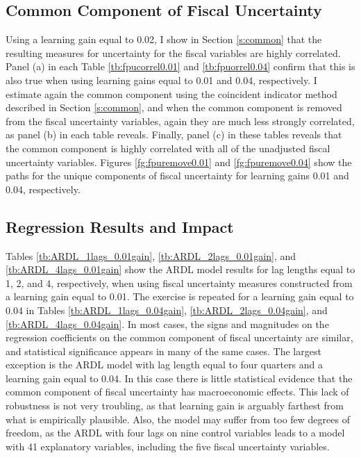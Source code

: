 \documentclass[11pt]{article}
\begin{document}
\subsection{Common Component of Fiscal Uncertainty}

Using a learning gain equal to 0.02, I show in Section \ref{s:common} that the resulting measures for uncertainty for the fiscal variables are highly correlated.  Panel (a) in each Table \ref{tb:fpucorrel0.01} and \ref{tb:fpuorrel0.04} confirm that this is also true when using learning gains equal to 0.01 and 0.04, respectively.  I estimate again the common component using the coincident indicator method described in Section \ref{s:common}, and when the common component is removed from the fiscal uncertainty variables, again they are much less strongly correlated, as panel (b) in each table reveals.  Finally, panel (c) in these tables reveals that the common component is highly correlated with all of the unadjusted fiscal uncertainty variables.  Figures \ref{fg:fpuremove0.01} and \ref{fg:fpuremove0.04} show the paths for the unique components of fiscal uncertainty for learning gains 0.01 and 0.04, respectively.

\subsection{Regression Results and Impact}
Tables \ref{tb:ARDL_1lags_0.01gain}, \ref{tb:ARDL_2lags_0.01gain}, and \ref{tb:ARDL_4lags_0.01gain} show the ARDL model results for lag lengths equal to 1, 2, and 4, respectively, when using fiscal uncertainty measures constructed from a learning gain equal to 0.01.  The exercise is repeated for a learning gain equal to 0.04 in Tables \ref{tb:ARDL_1lags_0.04gain}, \ref{tb:ARDL_2lags_0.04gain}, and \ref{tb:ARDL_4lags_0.04gain}.  In most cases, the signs and magnitudes on the regression coefficients on the common component of fiscal uncertainty are similar, and statistical significance appears in many of the same cases.  The largest exception is the ARDL model with lag length equal to four quarters and a learning gain equal to 0.04.  In this case there is little statistical evidence that the common component of fiscal uncertainty has macroeconomic effects.  This lack of robustness is not very troubling, as that learning gain is arguably farthest from what is empirically plausible.  Also, the model may suffer from too few degrees of freedom, as the ARDL with four lags on nine control variables leads to a model with 41 explanatory variables, including the five fiscal uncertainty variables.
\end{document}
